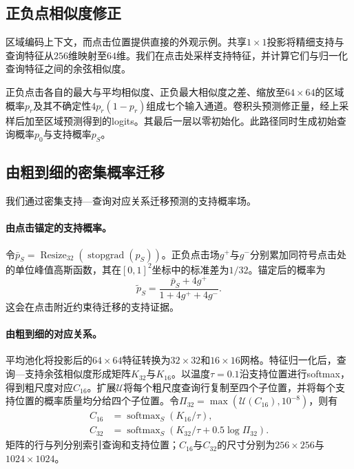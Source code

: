 \subsection{正负点相似度修正}
\label{sec:point}
区域编码上下文，而点击位置提供直接的外观示例。共享$1\times1$投影将精细支持与查询特征从$256$维映射至$64$维。我们在点击处采样支持特征，并计算它们与归一化查询特征之间的余弦相似度。

正负点击各自的最大与平均相似度、正负最大相似度之差、缩放至$64\times64$的区域概率$p_r$及其不确定性$4p_r(1-p_r)$组成七个输入通道。卷积头预测修正量，经上采样后加至区域预测得到的logits。其最后一层以零初始化。此路径同时生成初始查询概率$p_0$与支持概率$p_S$。

\subsection{由粗到细的密集概率迁移}
\label{sec:transfer}
我们通过密集支持—查询对应关系迁移预测的支持概率场。

\paragraph{由点击锚定的支持概率。}
令$\bar p_S=\operatorname{Resize}_{32}(\operatorname{stopgrad}(p_S))$。正负点击场$g^+$与$g^-$分别累加同符号点击处的单位峰值高斯函数，其在$[0,1]^2$坐标中的标准差为$1/32$。锚定后的概率为
\begin{equation}
 \widetilde p_S=\frac{\bar p_S+4g^+}{1+4g^++4g^-}.
\label{eq:anchor}
\end{equation}
这会在点击附近约束待迁移的支持证据。

\paragraph{由粗到细的对应关系。}
平均池化将投影后的$64\times64$特征转换为$32\times32$和$16\times16$网格。特征归一化后，查询—支持余弦相似度形成矩阵$K_{32}$与$K_{16}$。以温度$\tau=0.1$沿支持位置进行softmax，得到粗尺度对应$C_{16}$。扩展$\mathcal U$将每个粗尺度查询行复制至四个子位置，并将每个支持位置的概率质量均分给四个子位置。令$\Pi_{32}=\max(\mathcal U(C_{16}),10^{-8})$，则有
\begin{align}
 C_{16}&=\operatorname{softmax}_{S}(K_{16}/\tau),\\
 C_{32}&=\operatorname{softmax}_{S}\!\left(K_{32}/\tau
                  +0.5\log \Pi_{32}\right).
\label{eq:correspondence}
\end{align}
矩阵的行与列分别索引查询和支持位置；$C_{16}$与$C_{32}$的尺寸分别为$256\times256$与$1024\times1024$。

